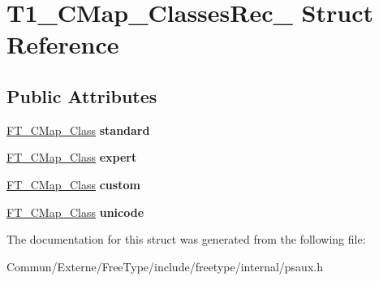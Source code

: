 \hypertarget{struct_t1___c_map___classes_rec__}{}\section{T1\+\_\+\+C\+Map\+\_\+\+Classes\+Rec\+\_\+ Struct Reference}
\label{struct_t1___c_map___classes_rec__}
\subsection*{Public Attributes}
\begin{DoxyCompactItemize}
\item 
\hyperlink{struct_f_t___c_map___class_rec__}{F\+T\+\_\+\+C\+Map\+\_\+\+Class} {\bfseries standard}\hypertarget{struct_t1___c_map___classes_rec___a11bc9e986af1c0cf91bd67e2e30028ca}{}\label{struct_t1___c_map___classes_rec___a11bc9e986af1c0cf91bd67e2e30028ca}

\item 
\hyperlink{struct_f_t___c_map___class_rec__}{F\+T\+\_\+\+C\+Map\+\_\+\+Class} {\bfseries expert}\hypertarget{struct_t1___c_map___classes_rec___a9576c404d5197dd66498725eacde1302}{}\label{struct_t1___c_map___classes_rec___a9576c404d5197dd66498725eacde1302}

\item 
\hyperlink{struct_f_t___c_map___class_rec__}{F\+T\+\_\+\+C\+Map\+\_\+\+Class} {\bfseries custom}\hypertarget{struct_t1___c_map___classes_rec___a21378ef457d58cc00f357011f45fba5e}{}\label{struct_t1___c_map___classes_rec___a21378ef457d58cc00f357011f45fba5e}

\item 
\hyperlink{struct_f_t___c_map___class_rec__}{F\+T\+\_\+\+C\+Map\+\_\+\+Class} {\bfseries unicode}\hypertarget{struct_t1___c_map___classes_rec___aab1eef66893dd7b0d25897612d056d4a}{}\label{struct_t1___c_map___classes_rec___aab1eef66893dd7b0d25897612d056d4a}

\end{DoxyCompactItemize}


The documentation for this struct was generated from the following file\+:\begin{DoxyCompactItemize}
\item 
Commun/\+Externe/\+Free\+Type/include/freetype/internal/psaux.\+h\end{DoxyCompactItemize}
